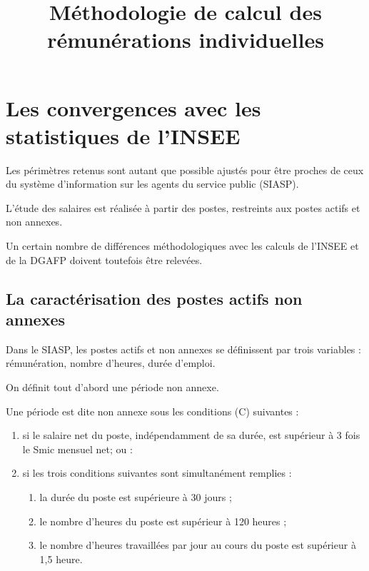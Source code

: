 \documentclass[]{article}
\title{Méthodologie de calcul des rémunérations individuelles}
\author{}
\date{}
\begin{document}
\maketitle


\section{Les convergences avec les statistiques de
l'INSEE}\label{les-convergences-avec-les-statistiques-de-linsee}

Les périmètres retenus sont autant que possible ajustés pour être
proches de ceux du système d'information sur les agents du service
public (SIASP).

L'étude des salaires est réalisée à partir des postes, restreints aux
postes actifs et non annexes.

Un certain nombre de différences méthodologiques avec les calculs de
l'INSEE et de la DGAFP doivent toutefois être relevées.

\subsection{La caractérisation des postes actifs non
annexes}\label{la-caracterisation-des-postes-actifs-non-annexes}

Dans le SIASP, les postes actifs et non annexes se définissent par trois
variables : rémunération, nombre d'heures, durée d'emploi.

On définit tout d'abord une période non annexe.

Une période est dite non annexe sous les conditions (C) suivantes :

\begin{enumerate}
\def\labelenumi{\arabic{enumi}.}
\itemsep1pt\parskip0pt
\item
  si le salaire net du poste, indépendamment de sa durée, est supérieur
  à 3 fois le Smic mensuel net; ou :\\
\item
  si les trois conditions suivantes sont simultanément remplies :

  \begin{enumerate}
  \def\labelenumii{\alph{enumii})}
  \itemsep1pt\parskip0pt
  \item
    la durée du poste est supérieure à 30 jours ;\\
  \item
    le nombre d'heures du poste est supérieur à 120 heures ;\\
  \item
    le nombre d'heures travaillées par jour au cours du poste est
    supérieur à 1,5 heure.
  \end{enumerate}
\end{enumerate}
\end{document}
